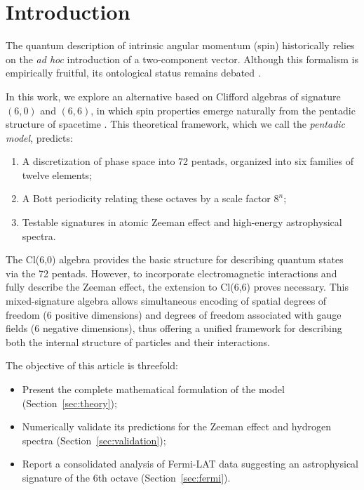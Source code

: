 \documentclass[11pt,a4paper]{article}
\theoremstyle{plain}
\theoremstyle{definition}
\theoremstyle{remark}
\begin{document}
\section{Introduction}

The quantum description of intrinsic angular momentum (spin) historically relies on the \textit{ad hoc} introduction of a two-component vector. Although this formalism is empirically fruitful, its ontological status remains debated \cite{rowlands2015foundations}.

In this work, we explore an alternative based on Clifford algebras of signature $(6,0)$ and $(6,6)$, in which spin properties emerge naturally from the pentadic structure of spacetime \cite{nebe2010even}. This theoretical framework, which we call the \textit{pentadic model}, predicts:

\begin{enumerate}
  \item A discretization of phase space into 72 pentads, organized into six families of twelve elements;
  \item A Bott periodicity \cite{bott1959stable} relating these octaves by a scale factor $8^n$;
  \item Testable signatures in atomic Zeeman effect and high-energy astrophysical spectra.
\end{enumerate}

The Cl(6,0) algebra provides the basic structure for describing quantum states via the 72 pentads. However, to incorporate electromagnetic interactions and fully describe the Zeeman effect, the extension to Cl(6,6) proves necessary. This mixed-signature algebra allows simultaneous encoding of spatial degrees of freedom (6 positive dimensions) and degrees of freedom associated with gauge fields (6 negative dimensions), thus offering a unified framework for describing both the internal structure of particles and their interactions.

The objective of this article is threefold:
\begin{itemize}
  \item Present the complete mathematical formulation of the model (Section~\ref{sec:theory});
  \item Numerically validate its predictions for the Zeeman effect and hydrogen spectra (Section~\ref{sec:validation});
  \item Report a consolidated analysis of Fermi-LAT data suggesting an astrophysical signature of the 6th octave (Section~\ref{sec:fermi}).
\end{itemize}
\end{document}

